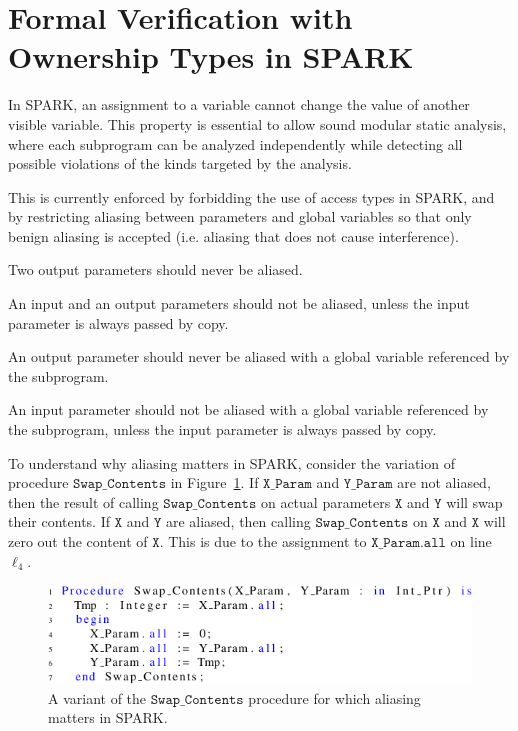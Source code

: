 \documentclass{llncs}
\newcommand\var[1]{\ensuremath{\mathtt{#1}}}
\begin{document}
\section{Formal Verification with Ownership Types in SPARK}

In SPARK, an assignment to a variable cannot change the value of another visible variable. This property is essential to allow sound modular static analysis,
where each subprogram can be analyzed independently while detecting all possible violations of the kinds targeted by the analysis.

This is currently enforced by forbidding the use of access types in SPARK, and by restricting aliasing between parameters and global variables so that only
benign aliasing is accepted (i.e. aliasing that does not cause interference).


\begin{compactitem}
  \item Two output parameters should never be aliased.
  \item An input and an output parameters should not be aliased, unless the input parameter is always passed by copy.
  \item An output parameter should never be aliased with a global variable referenced by the subprogram.
  \item An input parameter should not be aliased with a global variable referenced by the subprogram, unless the input parameter is always passed by copy.
\end{compactitem}

To understand why aliasing matters in SPARK, consider the variation of procedure \var{Swap\_Contents} in Figure~\ref{fig:spark_ex1}. If \var{X\_Param} and \var{Y\_Param}
are not aliased, then the result of calling \var{Swap\_Contents} on actual parameters \var{X} and \var{Y} will swap their contents. If \var{X} and \var{Y} are aliased, then calling
\var{Swap\_Contents} on \var{X} and \var{X} will zero out the content of \var{X}. This is due to the assignment to \var{X\_Param.all} on line $\ell_4$.


\begin{figure}[htb!]
\centering
  \captionsetup{justification=centering,margin=0.6cm}
   \includegraphics[]{spark_ex1}
   \caption{A variant of the \var{Swap\_Contents} procedure for which aliasing matters in SPARK.}
   \label{fig:spark_ex1}
\end{figure}
\end{document}
